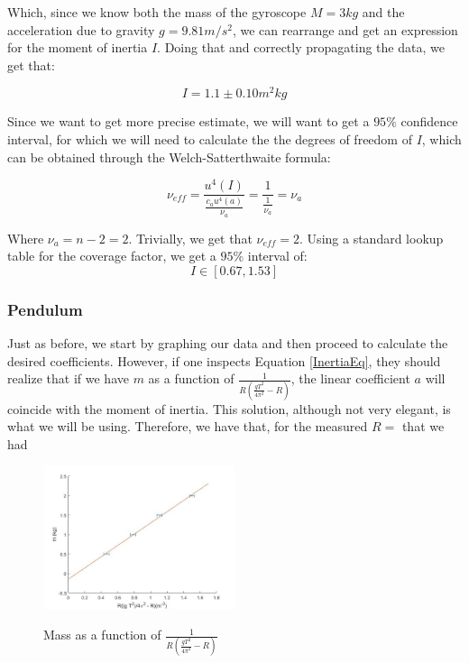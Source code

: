 \documentclass[a4paper,12pt]{article}
\begin{document}
Which, since we know both the mass of the gyroscope $M = 3kg$ and the acceleration due to gravity $g = 9.81 m/s^2$, we can rearrange and get an expression for the moment of inertia $I$. Doing that and correctly propagating the data, we get that:

\begin{equation}
  \label{Inertia1}
  I = 1.1 \pm 0.10 m^2kg
\end{equation}

Since we want to get more precise estimate, we will want to get a $95\%$ confidence interval, for which we will need to calculate the the degrees of freedom of $I$, which can be obtained through the Welch-Satterthwaite formula:

$$\nu_{eff} = \frac{u^4(I)}{\frac{c_a u^4(a)}{\nu_a}} =\frac{1}{\frac{1}{\nu_a}} = \nu_a $$


Where $\nu_a = n - 2 = 2$. Trivially, we get that $\nu_{eff} = 2$. Using a standard lookup table for the coverage factor, we get a $95\%$ interval of:
\begin{equation}
\label{inertia2}
I \in [0.67, 1.53]	
\end{equation}
  


\subsubsection{Pendulum}
Just as before, we start by graphing our data and then proceed to calculate the desired coefficients. However, if one inspects Equation \eqref{InertiaEq}, they should realize that if we have $m$ as a function of $\frac{1}{R\left(\frac{g T^2}{4\pi^2} - R\right)}$, the linear coefficient $a$ will coincide with the moment of inertia. This solution, although not very elegant, is what we will be using. Therefore, we have that, for the measured $R = $ that we had  

\begin{figure}[H]
	\caption{Mass as a function of $\frac{1}{R\left(\frac{g T^2}{4\pi^2} - R\right)}$ }
	\centering
	\includegraphics[width=0.5\textwidth]{part3.jpg}
	\label{foda3}
\end{figure} 
\end{document}
